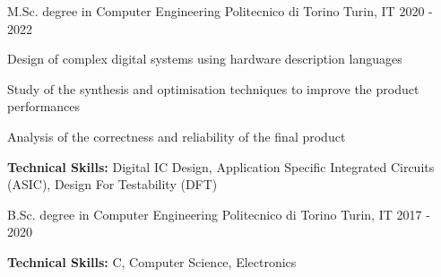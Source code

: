 

\begin{cventries}

  \cventry
    {M.Sc. degree in Computer Engineering} %
    {Politecnico di Torino} %
    {Turin, IT} %
    {2020 - 2022} %
    {
      \begin{cvitems} %
        \item {Design of complex digital systems using hardware description languages}
        \item {Study of the synthesis and optimisation techniques to improve the product performances}
        \item {Analysis of the correctness and reliability of the final product}
        \item {\textbf{Technical Skills:} Digital IC Design, Application Specific Integrated Circuits (ASIC), Design For Testability (DFT)}
      \end{cvitems}
    }
    
  \cventry
    {B.Sc. degree in Computer Engineering} %
    {Politecnico di Torino} %
    {Turin, IT} %
    {2017 - 2020} %
    {
      \begin{cvitems} %
        \item {\textbf{Technical Skills:} C, Computer Science, Electronics}
      \end{cvitems}
    }
    
\end{cventries}
